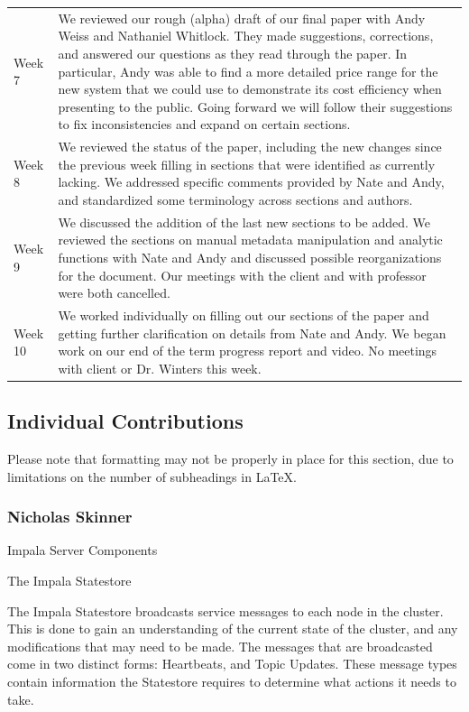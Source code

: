 \documentclass[onecolumn, draftclsnofoot,10pt, compsoc]{IEEEtran}
\begin{document}
\begin{tabular}{l | p{15 cm}}
    Week 7 & We reviewed our rough (alpha) draft of our final paper with Andy Weiss and Nathaniel Whitlock. They made suggestions, corrections, and answered our questions as they read through the paper. In particular, Andy was able to find a more detailed price range for the new system that we could use to demonstrate its cost efficiency when presenting to the public. Going forward we will follow their suggestions to fix inconsistencies and expand on certain sections.  \\
    Week 8 & We reviewed the status of the paper, including the new changes since the previous week filling in sections that were identified as currently lacking. We addressed specific comments provided by Nate and Andy, and standardized some terminology across sections and authors. \\
    Week 9 & We discussed the addition of the last new sections to be added. We reviewed the sections on manual metadata manipulation and analytic functions with Nate and Andy and discussed possible reorganizations for the document. Our meetings with the client and with professor were both cancelled. \\
    Week 10 & We worked individually on filling out our sections of the paper and getting further clarification on details from Nate and Andy. We began work on our end of the term progress report and video. No meetings with client or Dr. Winters this week. \\
\end{tabular}

\subsection{Individual Contributions}
Please note that formatting may not be properly in place for this section, due to limitations on the number of subheadings in LaTeX.
\subsubsection{Nicholas Skinner}
Impala Server Components

The Impala Statestore

The Impala Statestore broadcasts service messages to each node in the cluster.
This is done to gain an understanding of the current state of the cluster, and any modifications that may need to be made.
The messages that are broadcasted come in two distinct forms: Heartbeats, and Topic Updates.
These message types contain information the Statestore requires to determine what actions it needs to take. 
\end{document}
